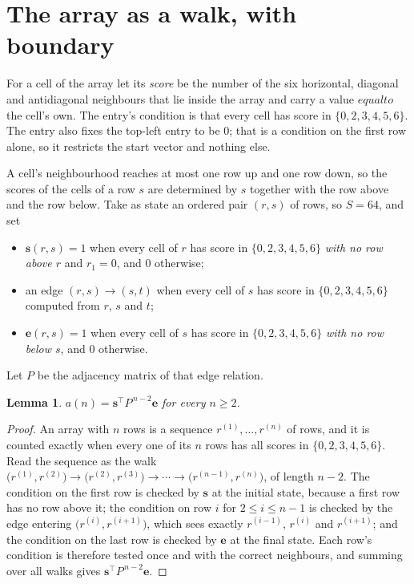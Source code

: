 \documentclass[11pt,a4paper]{article}
\theoremstyle{plain}
\newtheorem{lemma}[theorem]{Lemma}
\theoremstyle{definition}
\begin{document}
\section{The array as a walk, with boundary}

For a cell of the array let its \emph{score} be the number of the six horizontal, diagonal and antidiagonal neighbours that lie inside
the array and carry a value $equal to$ the cell's own. The entry's condition is that every cell
has score in $\{0,2,3,4,5,6\}$. The entry also fixes the top-left entry to be $0$; that is a condition on the first row alone, so it restricts the start vector and nothing else.

A cell's neighbourhood reaches at most one row up and one row down, so the scores of the
cells of a row $s$ are determined by $s$ together with the row above and the row below.
Take as state an ordered pair $(r,s)$ of rows, so $S=64$, and set
\begin{itemize}
\item $\mathbf{s}(r,s)=1$ when every cell of $r$ has score in $\{0,2,3,4,5,6\}$ \emph{with no row
above $r$} and $r_1=0$, and $0$ otherwise;
\item an edge $(r,s)\to(s,t)$ when every cell of $s$ has score in $\{0,2,3,4,5,6\}$ computed from
$r$, $s$ and $t$;
\item $\mathbf{e}(r,s)=1$ when every cell of $s$ has score in $\{0,2,3,4,5,6\}$ \emph{with no row
below $s$}, and $0$ otherwise.
\end{itemize}
Let $P$ be the adjacency matrix of that edge relation.

\begin{lemma}\label{lem:walk}
$a(n)=\mathbf{s}^{\!\top}P^{\,n-2}\mathbf{e}$ for every $n\ge2$.
\end{lemma}

\begin{proof}
An array with $n$ rows is a sequence $r^{(1)},\dots,r^{(n)}$ of rows, and it is counted
exactly when every one of its $n$ rows has all scores in $\{0,2,3,4,5,6\}$. Read the sequence as the
walk $\bigl(r^{(1)},r^{(2)}\bigr)\to\bigl(r^{(2)},r^{(3)}\bigr)\to\cdots\to
\bigl(r^{(n-1)},r^{(n)}\bigr)$, of length $n-2$. The condition on the first row is
checked by $\mathbf{s}$ at the initial state, because a first row has no row above it; the
condition on row $i$ for $2\le i\le n-1$ is checked by the edge entering
$\bigl(r^{(i)},r^{(i+1)}\bigr)$, which sees exactly $r^{(i-1)}$, $r^{(i)}$ and
$r^{(i+1)}$; and the condition on the last row is checked by $\mathbf{e}$ at the final
state. Each row's condition is therefore tested once and with the correct neighbours, and
summing over all walks gives $\mathbf{s}^{\!\top}P^{\,n-2}\mathbf{e}$.
\end{proof}
\end{document}
